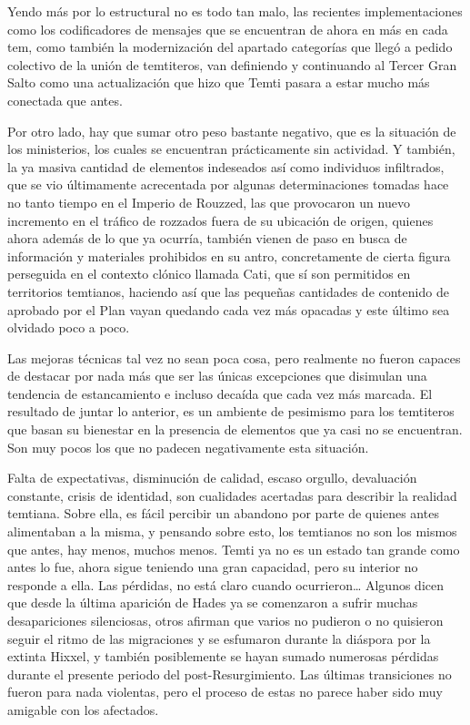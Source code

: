 \documentclass[
  spanish,
]{book}
\begin{document}
Yendo más por lo estructural no es todo tan malo, las recientes implementaciones como los codificadores de mensajes que se encuentran de ahora en más en cada tem, como también la modernización del apartado categorías que llegó a pedido colectivo de la unión de temtiteros, van definiendo y continuando al Tercer Gran Salto como una actualización que hizo que Temti pasara a estar mucho más conectada que antes.

Por otro lado, hay que sumar otro peso bastante negativo, que es la situación de los ministerios, los cuales se encuentran prácticamente sin actividad. Y también, la ya masiva cantidad de elementos indeseados así como individuos infiltrados, que se vio últimamente acrecentada por algunas determinaciones tomadas hace no tanto tiempo en el Imperio de Rouzzed, las que provocaron un nuevo incremento en el tráfico de rozzados fuera de su ubicación de origen, quienes ahora además de lo que ya ocurría, también vienen de paso en busca de información y materiales prohibidos en su antro, concretamente de cierta figura perseguida en el contexto clónico llamada Cati, que sí son permitidos en territorios temtianos, haciendo así que las pequeñas cantidades de contenido de aprobado por el Plan vayan quedando cada vez más opacadas y este último sea olvidado poco a poco.

Las mejoras técnicas tal vez no sean poca cosa, pero realmente no fueron capaces de destacar por nada más que ser las únicas excepciones que disimulan una tendencia de estancamiento e incluso decaída que cada vez más marcada. El resultado de juntar lo anterior, es un ambiente de pesimismo para los temtiteros que basan su bienestar en la presencia de elementos que ya casi no se encuentran. Son muy pocos los que no padecen negativamente esta situación.

Falta de expectativas, disminución de calidad, escaso orgullo, devaluación constante, crisis de identidad, son cualidades acertadas para describir la realidad temtiana. Sobre ella, es fácil percibir un abandono por parte de quienes antes alimentaban a la misma, y pensando sobre esto, los temtianos no son los mismos que antes, hay menos, muchos menos. Temti ya no es un estado tan grande como antes lo fue, ahora sigue teniendo una gran capacidad, pero su interior no responde a ella. Las pérdidas, no está claro cuando ocurrieron\ldots{} Algunos dicen que desde la última aparición de Hades ya se comenzaron a sufrir muchas desapariciones silenciosas, otros afirman que varios no pudieron o no quisieron seguir el ritmo de las migraciones y se esfumaron durante la diáspora por la extinta Hixxel, y también posiblemente se hayan sumado numerosas pérdidas durante el presente periodo del post-Resurgimiento. Las últimas transiciones no fueron para nada violentas, pero el proceso de estas no parece haber sido muy amigable con los afectados.
\end{document}
